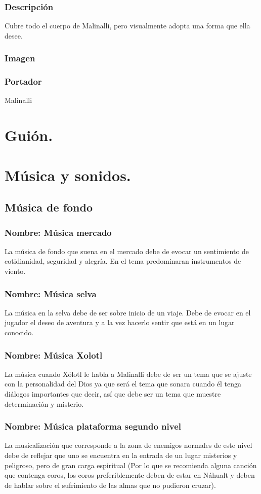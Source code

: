 \documentclass[11pt,letterpaper]{article}
\begin{document}
	\subsubsection{Descripción}
	Cubre todo el cuerpo de Malinalli, pero visualmente adopta una forma que ella desee.
	\subsubsection{Imagen}
	\subsubsection{Portador}
	Malinalli 

\section{Guión.}

\section{Música  y sonidos.}
\subsection{Música  de fondo}
\subsubsection{Nombre: Música  mercado}
La música de fondo que suena en el mercado debe de evocar un sentimiento de cotidianidad, seguridad y alegría. En el tema predominaran instrumentos de viento. 		
\subsubsection{Nombre: Música  selva}
La música en la selva debe de ser sobre inicio de un viaje. Debe de evocar en el jugador el deseo de aventura y a la vez hacerlo sentir que está en un lugar conocido.
\subsubsection{Nombre: Música  Xolotl} 
La música cuando Xólotl le habla a Malinalli debe de ser un tema que se ajuste con la personalidad del Dios ya que será el tema que sonara cuando él tenga diálogos importantes que decir, así que debe ser un tema que muestre determinación y misterio.
\subsubsection{Nombre: Música plataforma segundo nivel}
La musicalización que corresponde a la zona de enemigos normales de este nivel debe de reflejar que uno se encuentra en la entrada de un lugar misterios y peligroso, pero de gran carga espiritual (Por lo que se recomienda alguna canción que contenga coros, los coros preferiblemente deben de estar en Náhualt y deben de hablar sobre el sufrimiento de las almas que no pudieron cruzar).
\end{document}
